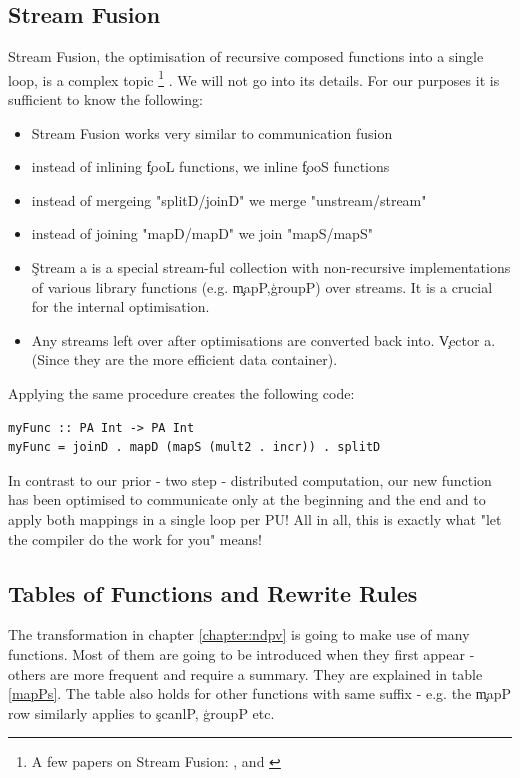   \subsection{Stream Fusion}
    Stream Fusion, the optimisation of recursive composed functions
    into a single loop, is a complex topic
    \footnote{A few papers on Stream Fusion:
    \cite{GenVectorFusion2013}, \cite{Fusion2007} and \cite{ArrayFusion2001Chakravarty}
    }
    . We will not go into its details.
    For our purposes it is sufficient to know the following:
    \begin{itemize}
      \item Stream Fusion works very similar to communication fusion
      \item instead of inlining \c{fooL} functions, we inline \c{fooS} functions
      \item instead of mergeing "splitD/joinD" we merge "unstream/stream"
      \item instead of joining "mapD/mapD" we join "mapS/mapS"
      \item \c{Stream a} is a special stream-ful collection with
        non-recursive implementations of various library functions (e.g. \c{mapP},\c{groupP})
        over streams. It is a crucial for the internal optimisation.
      \item Any streams left over after optimisations are converted back into.
        \c{Vector a}. (Since they are the more efficient data container).
    \end{itemize}
    Applying the same procedure creates the following code:
    \begin{lstlisting}
myFunc :: PA Int -> PA Int
myFunc = joinD . mapD (mapS (mult2 . incr)) . splitD
    \end{lstlisting}
    In contrast to our prior - two step - distributed computation,
    our new function has been optimised to communicate only
    at the beginning and the end and to apply both mappings
    in a single loop per PU!
    All in all,
    this is exactly what "let the compiler do the work for you" means!
    
  \subsection{Tables of Functions and Rewrite Rules}
    The transformation in chapter \ref{chapter:ndpv} is going to
    make use of many functions. Most of them are going to be
    introduced when they first appear - others are more frequent
    and require a summary. They are explained in table \ref{mapPs}.
    The table also holds for other functions with same suffix - e.g.
    the \c{mapP} row similarly applies to \c{scanlP}, \c{groupP} etc.
    
